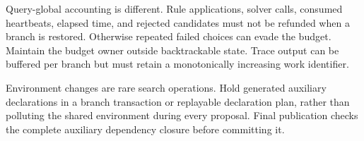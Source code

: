 Query-global accounting is different. Rule applications, solver calls, consumed heartbeats, elapsed time, and rejected candidates must not be refunded when a branch is restored. Otherwise repeated failed choices can evade the budget. Maintain the budget owner outside backtrackable state. Trace output can be buffered per branch but must retain a monotonically increasing work identifier.

Environment changes are rare search operations. Hold generated auxiliary declarations in a branch transaction or replayable declaration plan, rather than polluting the shared environment during every proposal. Final publication checks the complete auxiliary dependency closure before committing it.
